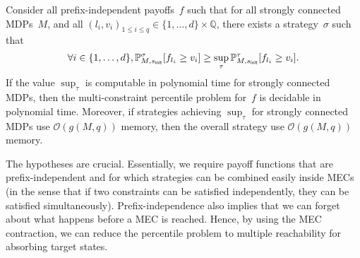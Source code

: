 \documentclass{llncs}
\newcommand{\initState}{\ensuremath{s_{{\sf init}}} }
\newcommand*{\pr}{\mathbb{P}}
\newcommand{\dimension}{\ensuremath{d} }
\begin{document}
\begin{theorem}
  \label{thm:general}
  Consider all prefix-independent payoffs~$f$ such that for all strongly connected MDPs~$M$, 
  and all $(l_i,v_i)_{1\leq i\leq q} \in \{1,\ldots,\dimension\}\times \mathbb{Q}$, 
there exists a strategy~$\sigma$ such that
  \[\forall i \in \{1,\ldots,\dimension\}, \pr_{M,\initState}^\sigma[f_{l_i} \geq
	v_i] \geq \sup_{\tau} \pr_{M,\initState}^\tau[f_{l_i}\geq v_i].\]
  If the value $\sup_{\tau}$ is computable in polynomial time for strongly connected MDPs, then the multi-constraint percentile problem for~$f$ is decidable in polynomial time.
  Moreover, if strategies achieving $\sup_\tau$ for strongly connected MDPs use $\mathcal{O}(g(M,q))$ memory,
  then the overall strategy use $\mathcal{O}(g(M,q))$ memory.
\end{theorem}


The hypotheses are crucial. Essentially, we require payoff functions that are prefix-independent and for which strategies can be combined easily inside MECs (in the sense that if two constraints can be satisfied independently, they can be satisfied simultaneously). Prefix-independence also implies that we can forget about what happens before a MEC is reached. Hence, by using the MEC contraction, we can reduce the percentile problem to multiple reachability for absorbing target states.
\end{document}
